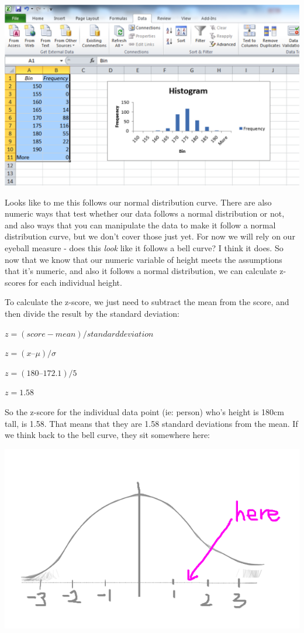 \documentclass[
]{book}
\begin{document}
\includegraphics{imgs/histo.png}

Looks like to me this follows our normal distribution curve. There are also numeric ways that test whether our data follows a normal distribution or not, and also ways that you can manipulate the data to make it follow a normal distribution curve, but we don't cover those just yet. For now we will rely on our eyeball measure - does this \emph{look} like it follows a bell curve? I think it does. So now that we know that our numeric variable of height meets the assumptions that it's numeric, and also it follows a normal distribution, we can calculate z-scores for each individual height.

To calculate the z-score, we just need to subtract the mean from the score, and then divide the result by the standard deviation:

\(z = (score - mean) / standard deviation\)

\(z = (x – μ) / σ\)

\(z = (180 – 172.1) / 5\)

\(z = 1.58\)

So the z-score for the individual data point (ie: person) who's height is 180cm tall, is 1.58. That means that they are 1.58 standard deviations from the mean. If we think back to the bell curve, they sit somewhere here:

\includegraphics{imgs/your_height_here.png}
\end{document}
